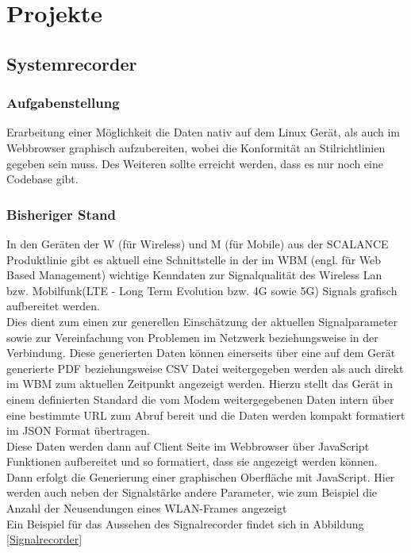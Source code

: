 \chapter{Projekte}

\section{Systemrecorder}
\subsection{Aufgabenstellung}
Erarbeitung einer Möglichkeit die Daten nativ auf dem Linux Gerät, als auch im Webbrowser graphisch aufzubereiten, wobei die Konformität an Stilrichtlinien gegeben sein muss.
Des Weiteren sollte erreicht werden, dass es nur noch eine Codebase gibt. 
\subsection{Bisheriger Stand}
In den Geräten der W (für Wireless) und M (für Mobile) aus der SCALANCE Produktlinie gibt es aktuell eine Schnittstelle in der im WBM (engl. für Web Based Management) wichtige Kenndaten zur Signalqualität des Wireless Lan bzw. Mobilfunk(LTE - Long Term Evolution bzw. 4G sowie 5G) Signals grafisch aufbereitet werden. \\
Dies dient zum einen zur generellen Einschätzung der aktuellen Signalparameter sowie zur Vereinfachung von Problemen im Netzwerk beziehungsweise in der Verbindung. Diese generierten Daten 
können einerseits über eine auf dem Gerät generierte PDF beziehungsweise CSV Datei weitergegeben werden als auch direkt im WBM zum aktuellen Zeitpunkt angezeigt werden. Hierzu stellt das Gerät 
in einem definierten Standard die vom Modem weitergegebenen Daten intern über eine bestimmte URL zum Abruf bereit und die Daten werden kompakt formatiert im JSON Format übertragen. \\
Diese Daten werden dann auf Client Seite im Webbrowser über JavaScript Funktionen aufbereitet und so formatiert, dass sie angezeigt werden können. Dann erfolgt die Generierung einer graphischen Oberfläche
mit JavaScript. Hier werden auch neben der Signalstärke andere Parameter, wie zum Beispiel die Anzahl der Neusendungen eines WLAN-Frames angezeigt\\
Ein Beispiel für das Aussehen des Signalrecorder findet sich in Abbildung \ref*{Signalrecorder}

